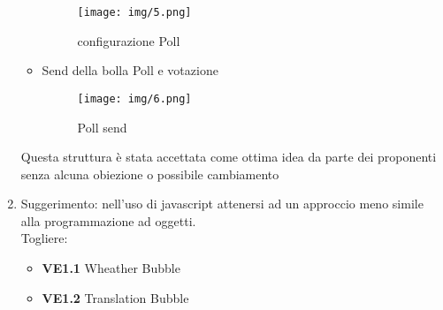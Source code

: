 \documentclass[10 pt,a4paper, openany]{article}
\begin{document}
\begin{enumerate}
\begin{itemize}
				\FloatBarrier
				\begin{figure}[ht]
					\centering
					\texttt{[image: img/5.png]}
					\caption{configurazione Poll}
				\end{figure}
				\clearpage
				
			\item Send della bolla Poll e votazione
			
				\FloatBarrier
				\begin{figure}[ht]
					\centering
					\texttt{[image: img/6.png]}
					\caption{Poll send}
				\end{figure}
			
		\end{itemize}


	Questa struttura è stata accettata come ottima idea da parte dei proponenti senza alcuna obiezione o possibile cambiamento
	

	
	
	\item Suggerimento: nell'uso di javascript attenersi ad un approccio meno simile alla programmazione ad oggetti. \\
	Togliere:
	\begin{itemize}
\item	\textbf{VE1.1} Wheather Bubble  
\item	\textbf{VE1.2} Translation Bubble
	\end{itemize}

	
\end{enumerate}
\end{document}
